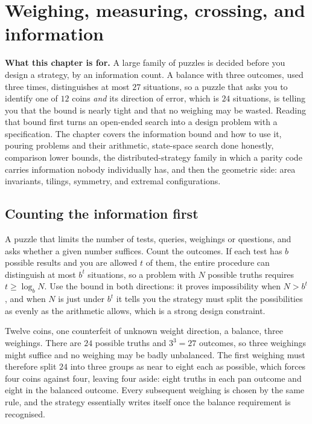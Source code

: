 \chapter{Weighing, measuring, crossing, and information}

\begin{orient}
\textbf{What this chapter is for.} A large family of puzzles is decided before you design a strategy, by an information count. A balance with three outcomes, used three times, distinguishes at most $27$ situations, so a puzzle that asks you to identify one of $12$ coins \emph{and} its direction of error, which is $24$ situations, is telling you that the bound is nearly tight and that no weighing may be wasted. Reading that bound first turns an open-ended search into a design problem with a specification. The chapter covers the information bound and how to use it, pouring problems and their arithmetic, state-space search done honestly, comparison lower bounds, the distributed-strategy family in which a parity code carries information nobody individually has, and then the geometric side: area invariants, tilings, symmetry, and extremal configurations.
\end{orient}

\section{Counting the information first}

\cue A puzzle that limits the number of tests, queries, weighings or questions, and asks whether a given number suffices.
\method Count the outcomes. If each test has $b$ possible results and you are allowed $t$ of them, the entire procedure can distinguish at most $b^{t}$ situations, so a problem with $N$ possible truths requires $t\geq\log_{b}N$. Use the bound in both directions: it proves impossibility when $N>b^{t}$, and when $N$ is just under $b^{t}$ it tells you the strategy must split the possibilities as evenly as the arithmetic allows, which is a strong design constraint.

\begin{worked}
Twelve coins, one counterfeit of unknown weight direction, a balance, three weighings. There are $24$ possible truths and $3^{3}=27$ outcomes, so three weighings might suffice and no weighing may be badly unbalanced. The first weighing must therefore split $24$ into three groups as near to eight each as possible, which forces four coins against four, leaving four aside: eight truths in each pan outcome and eight in the balanced outcome. Every subsequent weighing is chosen by the same rule, and the strategy essentially writes itself once the balance requirement is recognised.
\end{worked}

